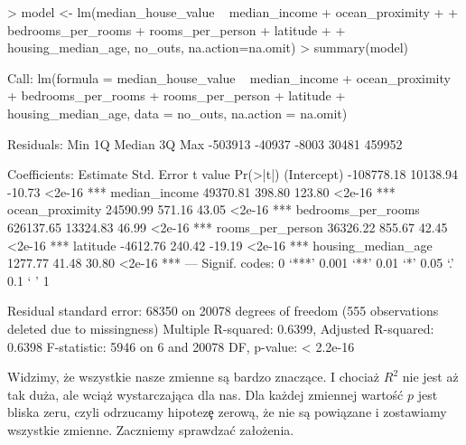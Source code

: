 \documentclass{article}
\begin{document}
\begin{Schunk}
\begin{Sinput}
> model <- lm(median_house_value ~ median_income + ocean_proximity +
+               bedrooms_per_rooms + rooms_per_person + latitude + 
+               housing_median_age, no_outs, na.action=na.omit)
> summary(model)
\end{Sinput}
\begin{Soutput}
Call:
lm(formula = median_house_value ~ median_income + ocean_proximity + 
    bedrooms_per_rooms + rooms_per_person + latitude + housing_median_age, 
    data = no_outs, na.action = na.omit)

Residuals:
    Min      1Q  Median      3Q     Max 
-503913  -40937   -8003   30481  459952 

Coefficients:
                     Estimate Std. Error t value Pr(>|t|)    
(Intercept)        -108778.18   10138.94  -10.73   <2e-16 ***
median_income        49370.81     398.80  123.80   <2e-16 ***
ocean_proximity      24590.99     571.16   43.05   <2e-16 ***
bedrooms_per_rooms  626137.65   13324.83   46.99   <2e-16 ***
rooms_per_person     36326.22     855.67   42.45   <2e-16 ***
latitude             -4612.76     240.42  -19.19   <2e-16 ***
housing_median_age    1277.77      41.48   30.80   <2e-16 ***
---
Signif. codes:  0 ‘***’ 0.001 ‘**’ 0.01 ‘*’ 0.05 ‘.’ 0.1 ‘ ’ 1

Residual standard error: 68350 on 20078 degrees of freedom
  (555 observations deleted due to missingness)
Multiple R-squared:  0.6399,	Adjusted R-squared:  0.6398 
F-statistic:  5946 on 6 and 20078 DF,  p-value: < 2.2e-16
\end{Soutput}
\end{Schunk}

\noindent
\quad Widzimy, że wszystkie nasze zmienne są bardzo znaczące. I chociaż $R^2$ nie jest aż tak duża, ale wciąż wystarczająca dla nas. Dla każdej zmiennej wartoś\'c $p$ jest bliska zeru, czyli odrzucamy hipotez\c e zerową, że nie są powiązane i zostawiamy wszystkie zmienne. Zaczniemy sprawdza\'c za\l ożenia.
\end{document}
